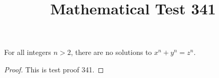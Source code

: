 \documentclass{amsart}
\begin{document}
\title{Mathematical Test 341}
\begin{theorem}
For all integers $n > 2$, there are no solutions to $x^n + y^n = z^n$.
\end{theorem}
\begin{proof}
This is test proof 341.
\end{proof}
\end{document}

